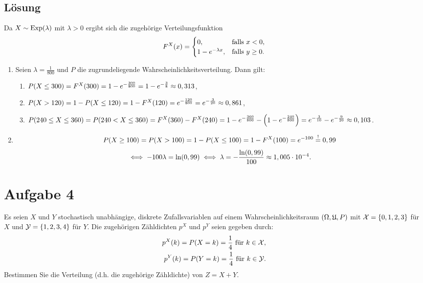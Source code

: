 \documentclass{exercise}
\begin{document}
    \subsection*{Lösung}
    Da \(X \sim \Exp\parentheses*{\lambda}\) mit \(\lambda > 0\) ergibt sich die zugehörige Verteilungsfunktion
    \[
        F^X\parentheses*{x} = \begin{cases}
            0, & \text{falls }x < 0,\\
            1 - e^{-\lambda x}, & \text{falls }y \ge 0.
        \end{cases}
    \]
    \begin{enumerate}
        \item Seien \(\lambda = \frac{1}{800}\) und \(P\) die zugrundeliegende Wahrscheinlichkeitsverteilung.
        Dann gilt:
        \begin{enumerate}
            \item \(P\parentheses*{X \le 300} = F^X\parentheses*{300} = 1 - e^{-\frac{300}{800}} = 1 - e^{-\frac{3}{8}} \approx 0,313\),
            \item \(P\parentheses*{X > 120} = 1 - P\parentheses*{X \le 120} = 1 - F^X\parentheses*{120} = e^{-\frac{120}{800}} = e^{-\frac{3}{20}} \approx 0,861\),
            \item \(P\parentheses*{240 \le X \le 360} = P\parentheses*{240 < X \le 360} = F^X\parentheses*{360} - F^X\parentheses*{240} = 1 - e^{-\frac{360}{800}} - \parentheses*{1 - e^{-\frac{240}{800}}} = e^{-\frac{3}{10}} - e^{-\frac{9}{20}} \approx 0,103\).
        \end{enumerate}
        \item
        \[
            P\parentheses*{X \ge 100} = P\parentheses*{X > 100} = 1 - P\parentheses*{X \le 100} = 1 - F^X\parentheses*{100} = e^{-100} \stackrel{!}{=} 0,99
        \]
        \[
            \iff -100\lambda = \ln\parentheses*{0,99} \iff \lambda = -\frac{\ln\parentheses*{0,99}}{100} \approx 1,005 \cdot 10^{-4}.
        \]
    \end{enumerate}


    \section*{Aufgabe 4}

    \begin{problem}
        Es seien \(X\) und \(Y\) stochastisch unabhängige, diskrete Zufallsvariablen auf einem Wahrscheinlichkeitsraum \(\parentheses*{\Omega, \mathfrak{U}, P}\) mit \(\mathcal{X} = \braces*{0, 1, 2, 3}\) für \(X\) und \(\mathcal{Y} = \braces*{1, 2, 3, 4}\) für \(Y\).
        Die zugehörigen Zähldichten \(p^X\) und \(p^Y\) seien gegeben durch:
        \begin{align*}
            p^X\parentheses*{k} = P\parentheses*{X = k} = \frac{1}{4}\text{ für }k \in \mathcal{X},\\
            p^Y\parentheses*{k} = P\parentheses*{Y = k} = \frac{1}{4}\text{ für }k \in \mathcal{Y}.
        \end{align*}
        Bestimmen Sie die Verteilung (d.h. die zugehörige Zähldichte) von \(Z = X + Y\).
    \end{problem}
\end{document}
